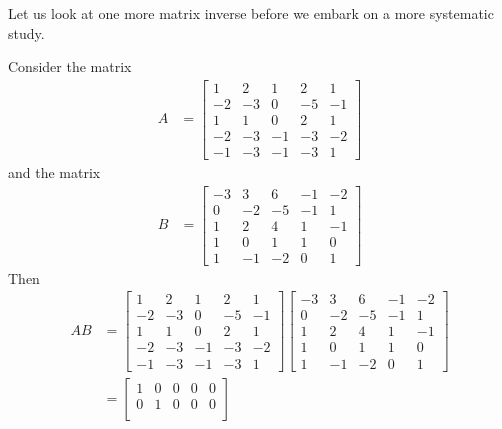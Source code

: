 \documentclass{ximera}
\begin{document}
Let us look at one more matrix inverse before we embark on a more systematic study.

\begin{example}
Consider the matrix
\begin{align*}
  A&=
     \begin{bmatrix}
       1 & 2 & 1 & 2 & 1 \\
       -2 & -3 & 0 & -5 & -1 \\
       1 & 1 & 0 & 2 & 1 \\
       -2 & -3 & -1 & -3 & -2 \\
       -1 & -3 & -1 & -3 & 1
     \end{bmatrix}
\end{align*}
and the matrix
\begin{align*}
  B&=
     \begin{bmatrix}
       -3 & 3 & 6 & -1 & -2 \\
       0 & -2 & -5 & -1 & 1 \\
       1 & 2 & 4 & 1 & -1 \\
       1 & 0 & 1 & 1 & 0 \\
       1 & -1 & -2 & 0 & 1
     \end{bmatrix}
\end{align*}
Then
\begin{align*}
  AB
  &=
    \begin{bmatrix}
      1 & 2 & 1 & 2 & 1 \\
      -2 & -3 & 0 & -5 & -1 \\
      1 & 1 & 0 & 2 & 1 \\
      -2 & -3 & -1 & -3 & -2 \\
      -1 & -3 & -1 & -3 & 1
    \end{bmatrix}
                          \begin{bmatrix}
                            -3 & 3 & 6 & -1 & -2 \\
                            0 & -2 & -5 & -1 & 1 \\
                            1 & 2 & 4 & 1 & -1 \\
                            1 & 0 & 1 & 1 & 0 \\
                            1 & -1 & -2 & 0 & 1
                          \end{bmatrix} \\
  &=
    \begin{bmatrix}
      1 & 0 & 0 & 0 & 0\\
      0 & 1 & 0 & 0 & 0\\

\end{bmatrix}
\end{align*}
\end{example}
\end{document}
